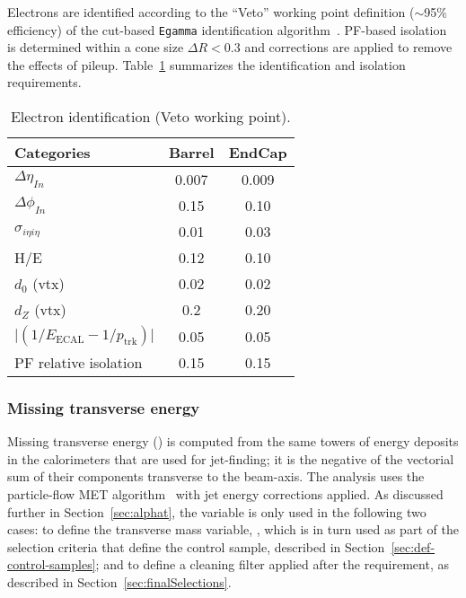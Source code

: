 Electrons are identified according to the ``Veto'' working point
definition ($\sim$95\% efficiency) of the cut-based \verb!Egamma!
identification algorithm~\cite{ref:electron-id}. PF-based
isolation~\cite{ref:electron-isolation} is determined within a cone
size $\Delta R < 0.3$ and corrections are applied to remove the effects 
of pileup. Table~\ref{tab:ele-id} summarizes the identification 
and isolation requirements. 

\begin{table}[h!]
  \caption{Electron identification (Veto working point).\label{tab:ele-id}}
  \centering
  \footnotesize
  \begin{tabular}{ lcc }
    \hline
    \hline
    Categories                                               & Barrel    & EndCap    \\
    \hline
    $\Delta \eta_{In}$                                       & 0.007     & 0.009     \\
    $\Delta \phi_{In}$                                       & 0.15      & 0.10      \\
    $\sigma_{i\eta i\eta}$                                   & 0.01      & 0.03      \\
    H/E                                                      & 0.12      & 0.10      \\
    $d_0$ (vtx)                                                 & 0.02      & 0.02      \\
    $d_Z$ (vtx)                                                 & 0.2       & 0.20      \\
    $\lvert(1/E_{\textrm{ECAL}} - 1/p_{\textrm{trk}})\rvert$ & 0.05      & 0.05      \\
    PF relative isolation                                    & 0.15      & 0.15      \\
    \hline
    \hline
  \end{tabular}
\end{table}


\subsubsection{Missing transverse energy\label{sec:recMET}}
Missing transverse energy (\met) is computed from the same towers of energy deposits 
in the calorimeters that are used for jet-finding; it is the negative of the vectorial
sum of their components transverse to the beam-axis. The analysis uses the particle-flow MET 
algorithm~\cite{ref:MET-corrections} with jet energy corrections applied. 
As discussed further in Section~\ref{sec:alphat}, the \met variable is only used in the 
following two cases: to define the transverse mass 
variable, \mt, which is in turn used as part of the selection criteria that define the 
\mj control sample, described in Section~\ref{sec:def-control-samples}; and to define a 
cleaning filter applied after the \alphat requirement, as described in 
Section~\ref{sec:finalSelections}.

